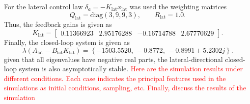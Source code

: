 \documentclass[10pt]{article}
\begin{document}
For the lateral control law $\delta_a = -K_{\mathrm{lat}}x_{\mathrm{lat}}$
%
%
%
was used the weighting matrices 
\begin{equation}
    Q_{\mathrm{lat}}=\mathrm{diag}(3,9,9,3),
    \qquad
    R_{\mathrm{lat}}=1.0.
\end{equation}
Thus, the feedback gains is given as
\begin{equation}
    K_{\mathrm{lat}} =
    \begin{bmatrix}
        0.11366923 & 2.95176288 & -0.16714788 & 2.67770629
    \end{bmatrix}.
\end{equation}
Finally, the closed-loop system is given as
\begin{equation}
    \lambda(A_{\mathrm{lat}}-B_{\mathrm{lat}}K_{\mathrm{lat}})
    =
    \left\{
    -1503.5520,\,
    -0.8772,\,
    -0.8991 \pm 5.2302j
    \right\}.
\end{equation}
given that all eigenvalues have negative real parts, the lateral-directional closed-loop system is also
asymptotically stable.
\textcolor{red}{Here are the simulation results under different conditions. Each case indicates the principal features used in the simulations as initial conditions, sampling, etc. Finally, discuss the results of the simulation }
\end{document}
